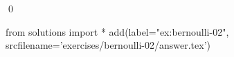 
\begin{ex} 
  \label{ex:bernoulli-02}
  
  \qed
\end{ex} 
\begin{python0}
from solutions import *
add(label="ex:bernoulli-02",
    srcfilename='exercises/bernoulli-02/answer.tex') 
\end{python0}
